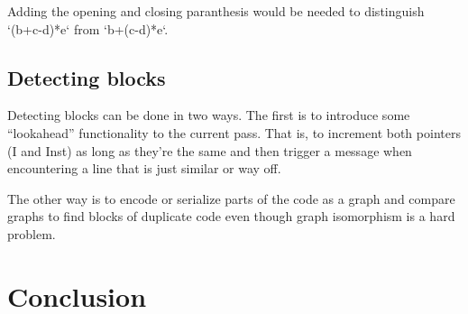 \documentclass[a4paper,11pt]{article}
\theoremstyle{mytheor}
\begin{document}
Adding the opening and closing paranthesis would be needed to distinguish `(b+c-d)*e` from `b+(c-d)*e`.

\subsection*{Detecting blocks}
Detecting blocks can be done in two ways.
The first is to introduce some ``lookahead'' functionality to the current pass. That is, to increment both pointers (I and Inst) as long as they're the same and then trigger a message when encountering a line that is just similar or way off.

The other way is to encode or serialize parts of the code as a graph and compare graphs to find blocks of duplicate code even though graph isomorphism is a hard problem.


\section*{Conclusion}
\end{document}
